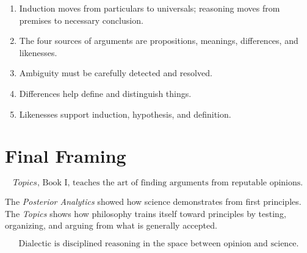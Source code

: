 \documentclass[12pt]{article}
\begin{document}
\begin{enumerate}[itemsep=0.5em]
    \item Induction moves from particulars to universals; reasoning moves from
    premises to necessary conclusion.

    \item The four sources of arguments are propositions, meanings,
    differences, and likenesses.

    \item Ambiguity must be carefully detected and resolved.

    \item Differences help define and distinguish things.

    \item Likenesses support induction, hypothesis, and definition.
\end{enumerate}

\section*{Final Framing}

\[
\boxed{
\textit{Topics}, \text{ Book I, teaches the art of finding arguments from reputable opinions.}
}
\]

The \textit{Posterior Analytics} showed how science demonstrates from first
principles. The \textit{Topics} shows how philosophy trains itself toward
principles by testing, organizing, and arguing from what is generally accepted.

\[
\boxed{
\text{Dialectic is disciplined reasoning in the space between opinion and science.}
}
\]
\end{document}
